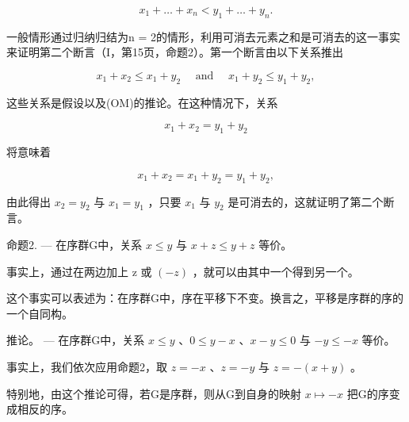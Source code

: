 \[
x _ {1} + \dots + x _ {n} <   y _ {1} + \dots + y _ {n}.
\]

一般情形通过归纳归结为n = 2的情形，利用可消去元素之和是可消去的这一事实来证明第二个断言（I，第15页，命题2）。第一个断言由以下关系推出

\[
x _ {1} + x _ {2} \leqslant x _ {1} + y _ {2} \quad \text { and } \quad x _ {1} + y _ {2} \leqslant y _ {1} + y _ {2},
\]

这些关系是假设以及(OM)的推论。在这种情况下，关系

\[
x _ {1} + x _ {2} = y _ {1} + y _ {2}
\]

将意味着

\[
x _ {1} + x _ {2} = x _ {1} + y _ {2} = y _ {1} + y _ {2},
\]

由此得出 \(x_{2} = y_{2}\) 与 \(x_{1} = y_{1}\) ，只要 \(x_{1}\) 与 \(y_{2}\) 是可消去的，这就证明了第二个断言。

命题2. --- 在序群G中，关系 \(x \leqslant y\) 与 \(x + z \leqslant y + z\) 等价。

事实上，通过在两边加上 z 或 \((-z)\) ，就可以由其中一个得到另一个。

这个事实可以表述为：在序群G中，序在平移下不变。换言之，平移是序群的序的一个自同构。

推论。 --- 在序群G中，关系 \(x \leqslant y\) 、\(0 \leqslant y - x\) 、\(x - y \leqslant 0\) 与 \(-y \leqslant -x\) 等价。

事实上，我们依次应用命题2，取 \(z = -x\) 、\(z = -y\) 与 \(z = - (x + y)\) 。

特别地，由这个推论可得，若G是序群，则从G到自身的映射 \(x \mapsto -x\) 把G的序变成相反的序。

